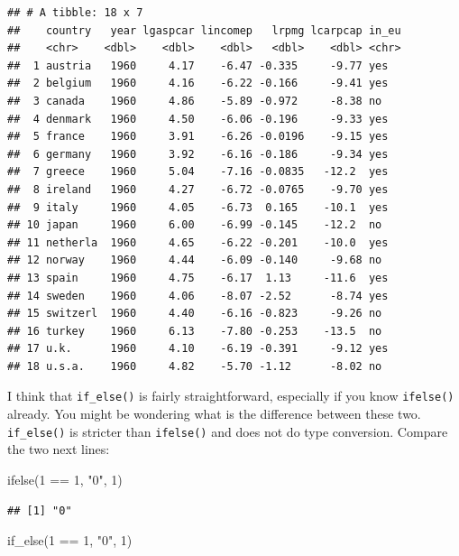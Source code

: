 \documentclass[
]{article}
\newenvironment{Shaded}{\begin{snugshade}}{\end{snugshade}}
\newcommand{\DecValTok}[1]{\textcolor[rgb]{0.00,0.00,0.81}{#1}}
\newcommand{\FunctionTok}[1]{\textcolor[rgb]{0.00,0.00,0.00}{#1}}
\newcommand{\NormalTok}[1]{#1}
\newcommand{\SpecialCharTok}[1]{\textcolor[rgb]{0.00,0.00,0.00}{#1}}
\newcommand{\StringTok}[1]{\textcolor[rgb]{0.31,0.60,0.02}{#1}}
\begin{document}
\begin{verbatim}
## # A tibble: 18 x 7
##    country   year lgaspcar lincomep   lrpmg lcarpcap in_eu
##    <chr>    <dbl>    <dbl>    <dbl>   <dbl>    <dbl> <chr>
##  1 austria   1960     4.17    -6.47 -0.335     -9.77 yes  
##  2 belgium   1960     4.16    -6.22 -0.166     -9.41 yes  
##  3 canada    1960     4.86    -5.89 -0.972     -8.38 no   
##  4 denmark   1960     4.50    -6.06 -0.196     -9.33 yes  
##  5 france    1960     3.91    -6.26 -0.0196    -9.15 yes  
##  6 germany   1960     3.92    -6.16 -0.186     -9.34 yes  
##  7 greece    1960     5.04    -7.16 -0.0835   -12.2  yes  
##  8 ireland   1960     4.27    -6.72 -0.0765    -9.70 yes  
##  9 italy     1960     4.05    -6.73  0.165    -10.1  yes  
## 10 japan     1960     6.00    -6.99 -0.145    -12.2  no   
## 11 netherla  1960     4.65    -6.22 -0.201    -10.0  yes  
## 12 norway    1960     4.44    -6.09 -0.140     -9.68 no   
## 13 spain     1960     4.75    -6.17  1.13     -11.6  yes  
## 14 sweden    1960     4.06    -8.07 -2.52      -8.74 yes  
## 15 switzerl  1960     4.40    -6.16 -0.823     -9.26 no   
## 16 turkey    1960     6.13    -7.80 -0.253    -13.5  no   
## 17 u.k.      1960     4.10    -6.19 -0.391     -9.12 yes  
## 18 u.s.a.    1960     4.82    -5.70 -1.12      -8.02 no
\end{verbatim}

I think that \texttt{if\_else()} is fairly straightforward, especially if you know \texttt{ifelse()} already. You
might be wondering what is the difference between these two. \texttt{if\_else()} is stricter than
\texttt{ifelse()} and does not do type conversion. Compare the two next lines:

\begin{Shaded}
\begin{Highlighting}[]
\FunctionTok{ifelse}\NormalTok{(}\DecValTok{1} \SpecialCharTok{==} \DecValTok{1}\NormalTok{, }\StringTok{"0"}\NormalTok{, }\DecValTok{1}\NormalTok{)}
\end{Highlighting}
\end{Shaded}

\begin{verbatim}
## [1] "0"
\end{verbatim}

\begin{Shaded}
\begin{Highlighting}[]
\FunctionTok{if\_else}\NormalTok{(}\DecValTok{1} \SpecialCharTok{==} \DecValTok{1}\NormalTok{, }\StringTok{"0"}\NormalTok{, }\DecValTok{1}\NormalTok{)}
\end{Highlighting}
\end{Shaded}
\end{document}

